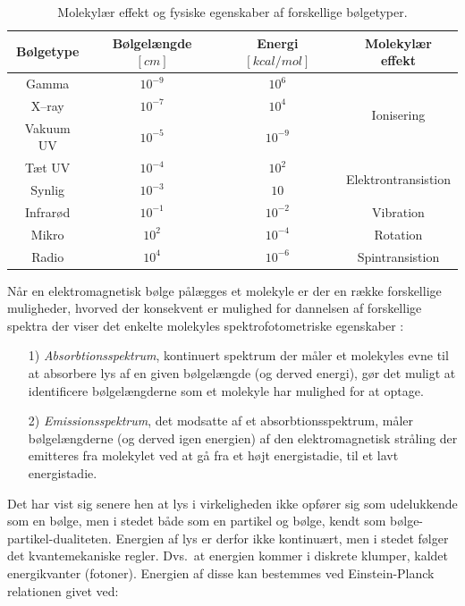     \begin{table}[H]\centering
        \caption{Molekylær effekt og fysiske egenskaber af forskellige bølgetyper.}
        \begin{tabular}{cccc}
            \toprule
            Bølgetype & Bølgelængde $\left[\si{cm}\right]$ & Energi $\left[\si{kcal\per mol}\right]$ & Molekylær effekt \\
            \midrule
            Gamma & $10^{-9}$ & $10^6$ & \multirow{3}{*}{Ionisering} \\
            X--ray & $10^{-7}$ & $10^4$ \\
            Vakuum UV & $10^{-5}$ & $10^{-9}$ \\
            \midrule
            Tæt UV & $10^{-4}$ & $10^2$ & \multirow{2}{*}{Elektrontransistion} \\
            Synlig & $10^{-3}$ & $10$ \\
            \midrule
            Infrarød & $10^{-1}$ & $10^{-2}$ & Vibration \\
            Mikro & $10^2$ & $10^{-4}$ & Rotation \\
            Radio & $10^4$ & $10^{-6}$ & Spintransistion \\
            \bottomrule
        \end{tabular}
    \end{table}
    Når en elektromagnetisk bølge pålægges et molekyle er der en række forskellige muligheder, hvorved der konsekvent er mulighed for dannelsen af forskellige spektra der viser det enkelte molekyles spektrofotometriske egenskaber \parencite{Finn2020}:
    \begin{itemize}
        \item[1)] \textit{Absorbtionsspektrum}, kontinuert spektrum der måler et molekyles evne til at absorbere lys af en given bølgelængde (og derved energi), gør det muligt at identificere bølgelængderne som et molekyle har mulighed for at optage.
        \item[2)] \textit{Emissionsspektrum}, det modsatte af et absorbtionsspektrum, måler bølgelængderne (og derved igen energien) af den elektromagnetisk stråling der emitteres fra molekylet ved at gå fra et højt energistadie, til et lavt energistadie.
    \end{itemize}
    Det har vist sig senere hen at lys i virkeligheden ikke opfører sig som udelukkende som en bølge, men i stedet både som en partikel og bølge, kendt som bølge-partikel-dualiteten. Energien af lys er derfor ikke kontinuært, men i stedet følger det kvantemekaniske regler. Dvs.\ at energien kommer i diskrete klumper, kaldet energikvanter (fotoner). Energien af disse kan bestemmes ved Einstein-Planck relationen givet ved:
